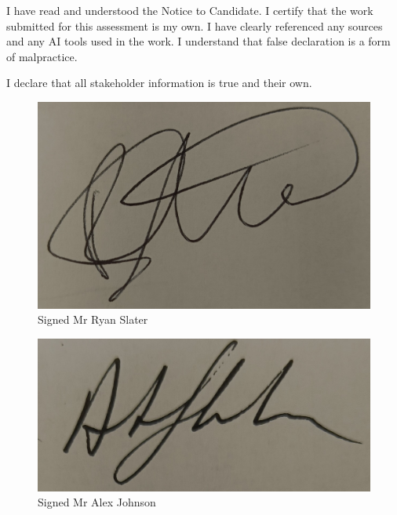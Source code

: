 
\begin{declaration}

I have read and understood the Notice to Candidate. I certify that the work submitted for this assessment is my own. I have clearly referenced any sources and any AI tools used in the work. I understand that false declaration is a form of malpractice.

\end{declaration}


\begin{center}
I declare that all stakeholder information is true and their own.
\end{center}


\begin{figure}[!htbp]
    \centering
    \includegraphics[width=0.5\linewidth]{IMG_20241213_124653362.jpg}
    \caption{Signed Mr Ryan Slater}
\end{figure}

\begin{figure}[!htbp]
    \centering
    \includegraphics[width=0.5\linewidth]{IMG_20241213_124653362~2.jpg}
    \caption{Signed Mr Alex Johnson}
\end{figure}


